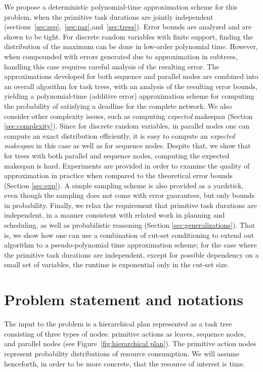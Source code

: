 \documentclass[review]{elsarticle}
\begin{document}
We propose a deterministic polynomial-time approximation scheme for this problem, when the primitive task durations are jointly independent
(sections~\ref{sec:seq},~\ref{sec:par},and~\ref{sec:trees}). 
Error bounds are analyzed and are shown to be tight. For discrete random variables with finite support, finding the distribution of the maximum can be done in low-order polynomial time. However, when compounded with errors generated due to approximation in subtrees, handling this case requires careful analysis of the resulting error. The approximations developed for both sequence and parallel nodes are combined into an overall algorithm for task trees, with an analysis of the resulting error bounds, yielding a polynomial-time (additive error) approximation scheme for computing the probability of satisfying a deadline for the complete network. 
We also consider other complexity issues, such as
computing {\em expected} makespan (Section \ref{sec:complexity}). Since for discrete random variables, in parallel nodes one can compute an exact distribution efficiently, it is easy to compute an {\em expected makespan} in this case as well as for sequence nodes. Despite that,  we show that for trees with both parallel and sequence nodes, computing the expected makespan is hard.
Experiments are provided in order to examine the quality of approximation in practice when compared to the theoretical 
error bounds (Section \ref{sec:exp}). A simple sampling scheme is also provided as a yardstick, even though the sampling does not come with error guarantees, but only bounds in probability. 
Finally, we relax the requirement that primitive task durations are independent, in a manner consistent with related work in planning and scheduling, as well as probabilistic 
reasoning (Section \ref{sec:generalizations}). That is, we show how one
can use a combination of cut-set conditioning to extend out algorithm to
a pseudo-polynomial time approximation scheme; for the case where the primitive task durations are independent, except for possible dependency on a small set of variables, the runtime is exponential only in the cut-set size.

\section{Problem statement and notations}\label{sec:formal}

The input to the problem is a hierarchical plan represented as a task tree consisting of three types of nodes: primitive actions as leaves, sequence nodes, and parallel nodes (see Figure~\ref{fig:hierarchical plan}).
The primitive action nodes represent probability distributions of resource consumption. We will assume henceforth, in order to be more concrete, that the resource of interest is time.
\end{document}
